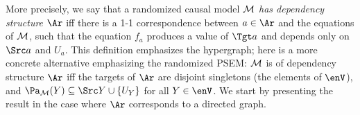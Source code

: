 More precisely, we say that a randomized causal model $\cal M$
\emph{has dependency structure $\Ar$}
iff there is a 1-1 correspondence between $a \in \Ar$ and the equations of $\cal M$, such that the equation $f_a$ produces a value of $\Tgt a$ and depends only on $\Src a$ and $U_a$. 
This definition emphasizes the hypergraph; here is a more concrete alternative emphasizing the randomized PSEM: $\cal M$ is of dependency structure $\Ar$ iff the targets of $\Ar$ are disjoint singletons (the elements of $\enV$), and $\Pa_{\cal M}(Y) \subseteq \Src Y \cup \{ U_Y \}$ for all $Y \in \enV$. 
%
We start by presenting the result in 
the case where $\Ar$ corresponds to a directed graph. 


